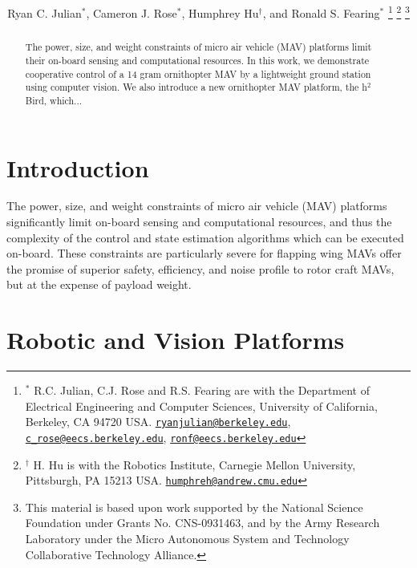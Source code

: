 \documentclass[letterpaper, 10 pt, conference]{ieeeconf}
\title{\LARGE \bf \papertitle}
\author{
    Ryan C. Julian$^{*}$,
    Cameron J. Rose$^{*}$,
    Humphrey Hu$^{\dagger}$, and
    Ronald S. Fearing$^{*}$
    \thanks{$^{*}$
    	R.C. Julian, C.J. Rose and R.S. Fearing are
        with the Department of Electrical Engineering and Computer Sciences,
        University of California, Berkeley, CA 94720 USA.
        \href{mailto:ryanjulian@berkeley.edu}{\tt ryanjulian@berkeley.edu},
        \href{mailto:c\_rose@eecs.berkeley.edu}{\tt c\_rose@eecs.berkeley.edu},
        \href{mailto:ronf@eecs.berkeley.edu}{\tt ronf@eecs.berkeley.edu}
    }
    \thanks{$^{\dagger}$
        H. Hu is with the Robotics Institute,
        Carnegie Mellon University, Pittsburgh, PA 15213 USA.
        \href{mailto:humphreh@andrew.cmu.edu}{\tt humphreh@andrew.cmu.edu}
    }
    \thanks{
        This material is based upon work supported by the National Science
        Foundation under Grants No. CNS-0931463, and by the Army Research
        Laboratory under the Micro Autonomous System and Technology
        Collaborative Technology Alliance.
    }
}
\begin{document}
\maketitle
\thispagestyle{empty}
\pagestyle{empty}

\begin{abstract}
The power, size, and weight constraints of micro air vehicle (MAV) platforms limit their on-board sensing and computational resources. In this work, we demonstrate cooperative control of a 14 gram ornithopter MAV by a lightweight ground station using computer vision. We also introduce a new ornithopter MAV platform, the h$^2$Bird, which...
\end{abstract}

\section{Introduction}
The power, size, and weight constraints of micro air vehicle (MAV) platforms significantly limit on-board sensing and computational resources, and thus the complexity of the control and state estimation algorithms which can be executed on-board. These constraints are particularly severe for flapping wing MAVs offer the promise of superior safety, efficiency, and noise profile to rotor craft MAVs, but at the expense of payload weight.

\section{Robotic and Vision Platforms}

\end{document}
